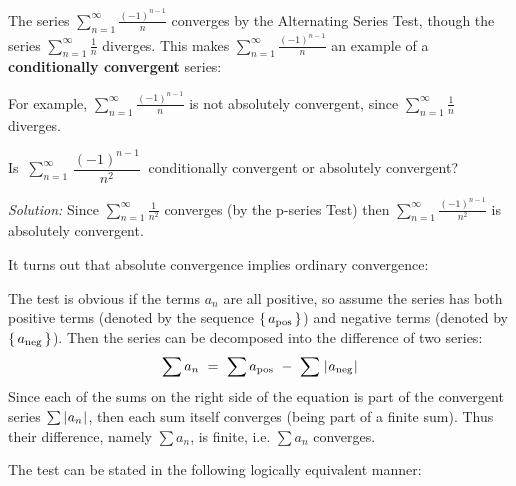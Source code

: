 The series $\sum_{n=1}^{\infty} \frac{(-1)^{n-1}}{n}$ converges by the
Alternating Series Test, though the series $\sum_{n=1}^{\infty} \frac{1}{n}$
diverges. This makes $\sum_{n=1}^{\infty} \frac{(-1)^{n-1}}{n}$ an example of a
\textbf{conditionally convergent} series:


\noindent For example, $\sum_{n=1}^{\infty} \frac{(-1)^{n-1}}{n}$ is not
absolutely convergent, since $\sum_{n=1}^{\infty} \frac{1}{n}$ diverges.

\begin{exmp}
\noindent Is
$~\displaystyle\sum_{n=1}^{\infty} \,\dfrac{(-1)^{n-1}}{n^2}~$ conditionally
convergent or absolutely convergent?\vspace{1mm}
\par\noindent\emph{Solution:} Since $\sum_{n=1}^{\infty} \frac{1}{n^2}$
converges (by the p-series Test) then
$\sum_{n=1}^{\infty} \frac{(-1)^{n-1}}{n^2}$ is absolutely convergent.
\end{exmp}
\divider
\vspace{2mm}

It turns out that absolute convergence implies ordinary convergence:


The test is obvious if the terms $a_n$ are all positive, so assume
the series has both positive terms (denoted by the sequence
$\left\lbrace\mspace{3mu}a_{\text{pos}}\mspace{3mu}\right\rbrace$) and negative terms (denoted by $\left\lbrace\mspace{3mu}a_{\text{neg}}\mspace{3mu}\right\rbrace$).
Then the series can be decomposed into the difference of two series:
\[
\sum a_n ~=~ \sum a_{\text{pos}} ~-~ \sum \;\lvert\mspace{1mu}a_{\text{neg}}\mspace{1mu}\rvert
\]
Since each of the sums on the right side of the equation is part of the
convergent series $\sum \,\lvert\mspace{1mu}a_n\mspace{1mu}\rvert$, then each sum itself converges (being part
of a finite sum). Thus their difference, namely $\sum a_n$, is finite, i.e.
$\sum a_n$ converges.

The test can be stated in the following logically equivalent manner:


